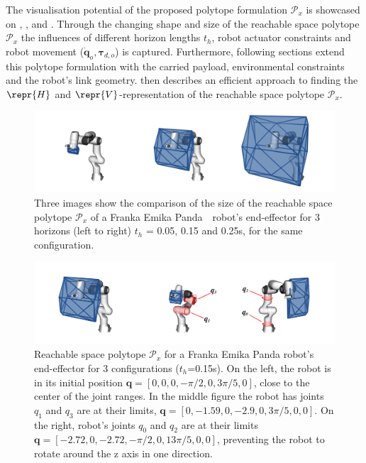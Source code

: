 The visualisation potential of the proposed polytope formulation $\mathcal{P}_x$ is showcased on , , and . Through the changing shape and size of the reachable space polytope $\mathcal{P}_x$ the influences of different horizon lengths $t_h$, robot actuator constraints and robot movement ($\dot{\bm{q}}_o,\bm{\tau}_{d,o}$) is captured. Furthermore, following sections extend this polytope formulation with the carried payload, environmental constraints and the robot's link geometry.  then describes an efficient approach to finding the $\repr{H}$ and $\repr{V}$-representation of the reachable space polytope $\mathcal{P}_x$. 


\begin{figure}[!h]
    \centering
    \includegraphics[width=\linewidth]{Papers/images/horizon.png}
    \caption{Three images show the comparison of the size of the reachable space polytope $\mathcal{P}_x$ of a Franka Emika Panda\protect\footnotemark ~~robot's end-effector for 3 horizons  (left to right) $t_h$ = 0.05, 0.15 and 0.25s, for the same configuration. } 
    \label{fig:horizon}
\end{figure}

\begin{figure}[!h]
    \centering
    \includegraphics[width=\linewidth]{Papers/images/limits.png}
    \caption{Reachable space polytope $\mathcal{P}_x$ for a Franka Emika Panda robot's end-effector for 3 configurations ($t_h$=0.15s). On the left, the robot is in its initial position $\bm{q}=[0,0,0,-\pi/2, 0, 3\pi/5,0]$, close to the center of the joint ranges. 
    In the middle figure the robot has joints $q_1$ and $q_3$ are at their limits, $\bm{q}=[0,-1.59,0,-2.9,0,3\pi/5,0,0]$. 
    On the right, robot's joints $q_0$ and $q_2$ are at their limits $\bm{q}=[-2.72,0, -2.72,-\pi/2,0,13\pi/5,0,0]$, preventing the robot to rotate around the z axis in one direction.
    }
    \label{fig:limits}
\end{figure}

